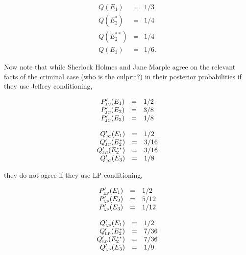 \documentclass[11pt]{article}
\begin{document}
\begin{equation}
  \label{eq:marpleprior}
  \begin{array}{rcl}
  Q(E_{1})&=&1/3\\
  Q(E_{2}^{*})&=&1/4\\
  Q(E_{2}^{**})&=&1/4\\
  Q(E_{3})&=&1/6.
\end{array}
\end{equation}

Now note that while Sherlock Holmes and Jane Marple agree on the
relevant facts of the criminal case (who is the culprit?) in their
posterior probabilities if they use Jeffrey conditioning,

\begin{equation}
  \label{eq:sherlockposteriorjc}
  \begin{array}{rcl}
  P'_{\mbox{\tiny JC}}(E_{1})&=&1/2\\
  P'_{\mbox{\tiny JC}}(E_{2})&=&3/8\\
  P'_{\mbox{\tiny JC}}(E_{3})&=&1/8
\end{array}
\end{equation}

\begin{equation}
  \label{eq:marpleposteriorjc}
  \begin{array}{rcl}
  Q'_{\mbox{\tiny JC}}(E_{1})&=&1/2\\
  Q'_{\mbox{\tiny JC}}(E_{2}^{*})&=&3/16\\
  Q'_{\mbox{\tiny JC}}(E_{2}^{**})&=&3/16\\
  Q'_{\mbox{\tiny JC}}(E_{3})&=&1/8
\end{array}
\end{equation}

they do not agree if they use LP conditioning,

\begin{equation}
  \label{eq:sherlockposteriorlp}
  \begin{array}{rcl}
  P'_{\mbox{\tiny LP}}(E_{1})&=&1/2\\
  P'_{\mbox{\tiny LP}}(E_{2})&=&5/12\\
  P'_{\mbox{\tiny LP}}(E_{3})&=&1/12
\end{array}
\end{equation}

\begin{equation}
  \label{eq:marpleposteriorlp}
  \begin{array}{rcl}
  Q'_{\mbox{\tiny LP}}(E_{1})&=&1/2\\
  Q'_{\mbox{\tiny LP}}(E_{2}^{*})&=&7/36\\
  Q'_{\mbox{\tiny LP}}(E_{2}^{**})&=&7/36\\
  Q'_{\mbox{\tiny LP}}(E_{3})&=&1/9.
\end{array}
\end{equation}
\end{document}
